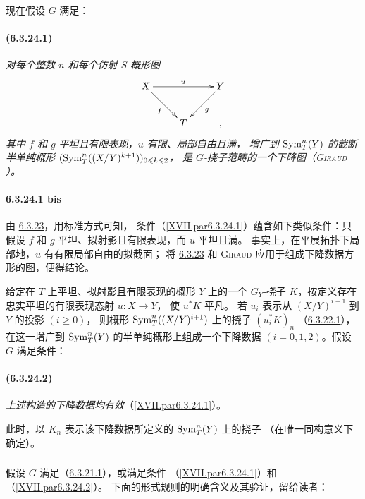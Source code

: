 现在假设 $G$ 满足：

\paragraph*{(6.3.24.1)}
\emph{对每个整数 $n$ 和每个仿射 $S$-概形图
\[
\xymatrix{
X \ar[rr]^{u} \ar[rd]_{f}& & Y\ar[ld]^{g}\\
  &T&,
}
\]
其中 $f$ 和 $g$ 平坦且有限表现，$u$ 有限、局部自由且满，
增广到 $\operatorname{Sym}^{n}_{T}(Y)$ 的截断半单纯概形
$(\operatorname{Sym}^{n}_{T}((X/Y)^{k+1}))_{0\leqslant k\leqslant 2}$，
是 $G$-挠子范畴的一个下降图\emph{（\textsc{Giraud} \cite{sga4.exp.XVII.bib.Gi}）}。}

\paragraph*{6.3.24.1 bis}
由 \hyperref[XVII.prop6.3.23]{6.3.23}，用标准方式可知，
条件（\ref{XVII.par6.3.24.1}）蕴含如下类似条件：只假设 $f$ 和 $g$
平坦、拟射影且有限表现，而 $u$ 平坦且满。
事实上，在平展拓扑下局部地，$u$ 有有限局部自由的拟截面；
将 \hyperref[XVII.prop6.3.23]{6.3.23} 和 \textsc{Giraud} \cite{sga4.exp.XVII.bib.Gi}
应用于组成下降数据方形的图，便得结论。

给定\pageoriginale 在 $T$ 上平坦、拟射影且有限表现的概形 $Y$ 上的一个
$G_{Y}$-挠子 $K$，按定义存在忠实平坦的有限表现态射 $u:X\rightarrow Y$，
使 $u^{\ast}K$ 平凡。
若 $u_{i}$ 表示从 $(X/Y)^{i+1}$ 到 $Y$ 的投影 $(i\geq 0)$，
则概形 $\operatorname{Sym}^{n}_{T}((X/Y)^{i+1})$ 上的挠子 $(u^{\ast}_{i}K)_{n}$
（\hyperref[XVII.lem6.3.22.1]{6.3.22.1}），在这一增广到 $\operatorname{Sym}^{n}_{T}(Y)$
的半单纯概形上组成一个下降数据 $(i=0,1,2)$。假设 $G$ 满足条件：

\paragraph*{(6.3.24.2)}
\emph{上述构造的下降数据均有效}（\cf \ref{XVII.par6.3.24.1}）。

此时，以 $K_{n}$ 表示该下降数据所定义的 $\operatorname{Sym}^{n}_{T}(Y)$ 上的挠子
（在唯一同构意义下确定）。

\subsubsection{}
假设 $G$ 满足（\hyperref[XVII.par6.3.21.1]{6.3.21.1}），或满足条件
（\ref{XVII.par6.3.24.1}）和（\ref{XVII.par6.3.24.2}）。
下面的形式规则的明确含义及其验证，留给读者：

